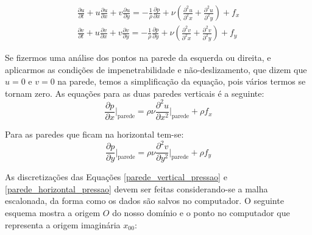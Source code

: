 \documentclass[journal]{IEEEtran}
\begin{document}
\begin{eqnarray}
\frac{\partial u}{\partial t}+u\frac{\partial u}{\partial x}+v\frac{\partial
u}{\partial y}=-\frac{1}{\rho}\frac{\partial p}{\partial
x}+\nu\left(\frac{\partial^2 u}{\partial^2 x}+\frac{\partial^2 u}{\partial^2
y}\right)+f_x\\
\frac{\partial v}{\partial t}+u\frac{\partial v}{\partial x}+v\frac{\partial
v}{\partial y}=-\frac{1}{\rho}\frac{\partial p}{\partial
y}+\nu\left(\frac{\partial^2 v}{\partial^2 x}+\frac{\partial^2 v}{\partial^2
y}\right)+f_y
\end{eqnarray}

Se fizermos uma análise dos pontos na parede da esquerda ou
direita, e aplicarmos as condições de impenetrabilidade e não-deslizamento, que
dizem que $u=0$ e $v=0$ na parede, temos a simplificação da equação, pois vários
termos se tornam zero. As equações para as duas paredes verticais é a seguinte:
\begin{equation}
\frac{\partial p}{\partial x}\Bigg|_{\textrm{parede}}=\rho\nu\frac{\partial^2
u}{\partial x^2}\Bigg|_{\textrm{parede}}+\rho f_x \label{parede_vertical_pressao}
\end{equation}

Para as paredes que ficam na horizontal tem-se:
\begin{equation}
\frac{\partial p}{\partial y}\Bigg|_{\textrm{parede}}=\rho\nu\frac{\partial^2
v}{\partial y^2}\Bigg|_{\textrm{parede}}+\rho f_y \label{parede_horizontal_pressao}
\end{equation}

As discretizações das Equações \ref{parede_vertical_pressao} e \ref{parede_horizontal_pressao} devem ser feitas considerando-se a malha escalonada, da forma como os dados são salvos no computador. O seguinte esquema mostra a origem $O$ do nosso domínio e o ponto no computador que representa a origem imaginária $x_{00}$:
\end{document}
